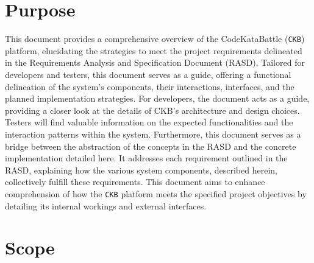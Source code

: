 \section{Purpose}
\label{sec:purpose}
This document provides a comprehensive overview of the CodeKataBattle (\verb|CKB|) platform, elucidating the strategies to meet the project requirements delineated in the Requirements Analysis and Specification Document (RASD). 
Tailored for developers and testers, this document serves as a guide, offering a functional delineation of the system's components, their interactions, interfaces, and the planned implementation strategies.
For developers, the document acts as a guide, providing a closer look at the details of CKB's architecture and design choices.
Testers will find valuable information on the expected functionalities and the interaction patterns within the system.
Furthermore, this document serves as a bridge between the abstraction of the concepts in the RASD and the concrete implementation detailed here. 
It addresses each requirement outlined in the RASD, explaining how the various system components, described herein, collectively fulfill these requirements. 
This document aims to enhance comprehension of how the \verb|CKB| platform meets the specified project objectives by detailing its internal workings and external interfaces.

\section{Scope}
\label{sec:scope}


